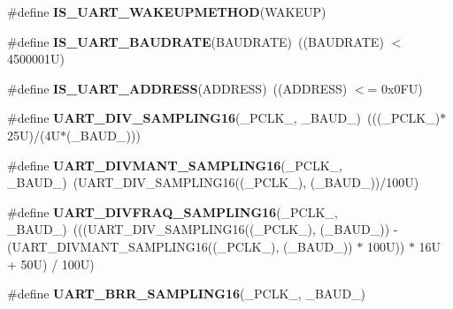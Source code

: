 \begin{DoxyCompactItemize}
\item 
\#define {\bfseries I\+S\+\_\+\+U\+A\+R\+T\+\_\+\+W\+A\+K\+E\+U\+P\+M\+E\+T\+H\+OD}(W\+A\+K\+E\+UP)
\item 
\mbox{\label{group___u_a_r_t___private___macros_ga5d657d5c8e47b147a834e0018e9407c2}} 
\#define {\bfseries I\+S\+\_\+\+U\+A\+R\+T\+\_\+\+B\+A\+U\+D\+R\+A\+TE}(B\+A\+U\+D\+R\+A\+TE)~((B\+A\+U\+D\+R\+A\+TE) $<$ 4500001\+U)
\item 
\mbox{\label{group___u_a_r_t___private___macros_ga2c4dce8c60f202455e6f1481fc441f98}} 
\#define {\bfseries I\+S\+\_\+\+U\+A\+R\+T\+\_\+\+A\+D\+D\+R\+E\+SS}(A\+D\+D\+R\+E\+SS)~((A\+D\+D\+R\+E\+SS) $<$= 0x0\+F\+U)
\item 
\mbox{\label{group___u_a_r_t___private___macros_gabd6dd99fff6cd5c0374780fd72a61e6e}} 
\#define {\bfseries U\+A\+R\+T\+\_\+\+D\+I\+V\+\_\+\+S\+A\+M\+P\+L\+I\+N\+G16}(\+\_\+\+P\+C\+L\+K\+\_\+,  \+\_\+\+B\+A\+U\+D\+\_\+)~(((\+\_\+\+P\+C\+L\+K\+\_\+)$\ast$25\+U)/(4\+U$\ast$(\+\_\+\+B\+A\+U\+D\+\_\+)))
\item 
\mbox{\label{group___u_a_r_t___private___macros_ga9cd479aff25c454d9d4f3c1c20517c86}} 
\#define {\bfseries U\+A\+R\+T\+\_\+\+D\+I\+V\+M\+A\+N\+T\+\_\+\+S\+A\+M\+P\+L\+I\+N\+G16}(\+\_\+\+P\+C\+L\+K\+\_\+,  \+\_\+\+B\+A\+U\+D\+\_\+)~(U\+A\+R\+T\+\_\+\+D\+I\+V\+\_\+\+S\+A\+M\+P\+L\+I\+N\+G16((\+\_\+\+P\+C\+L\+K\+\_\+), (\+\_\+\+B\+A\+U\+D\+\_\+))/100\+U)
\item 
\mbox{\label{group___u_a_r_t___private___macros_gade99ebfd7502df11b366c48fac5417d7}} 
\#define {\bfseries U\+A\+R\+T\+\_\+\+D\+I\+V\+F\+R\+A\+Q\+\_\+\+S\+A\+M\+P\+L\+I\+N\+G16}(\+\_\+\+P\+C\+L\+K\+\_\+,  \+\_\+\+B\+A\+U\+D\+\_\+)~(((U\+A\+R\+T\+\_\+\+D\+I\+V\+\_\+\+S\+A\+M\+P\+L\+I\+N\+G16((\+\_\+\+P\+C\+L\+K\+\_\+), (\+\_\+\+B\+A\+U\+D\+\_\+)) -\/ (U\+A\+R\+T\+\_\+\+D\+I\+V\+M\+A\+N\+T\+\_\+\+S\+A\+M\+P\+L\+I\+N\+G16((\+\_\+\+P\+C\+L\+K\+\_\+), (\+\_\+\+B\+A\+U\+D\+\_\+)) $\ast$ 100\+U)) $\ast$ 16\+U + 50\+U) / 100\+U)
\item 
\#define {\bfseries U\+A\+R\+T\+\_\+\+B\+R\+R\+\_\+\+S\+A\+M\+P\+L\+I\+N\+G16}(\+\_\+\+P\+C\+L\+K\+\_\+,  \+\_\+\+B\+A\+U\+D\+\_\+)
\item 

\end{DoxyCompactItemize}
